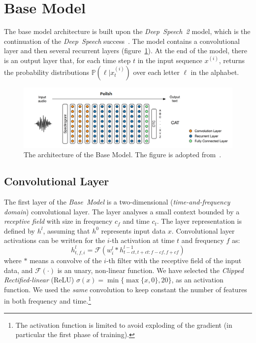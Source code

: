 \section{Base Model}\label{sec:base-model}
The base model architecture is built upon the \textit{Deep~Speech~2} model, which is
the continuation of the \textit{Deep~Speech} success~\cite{hannun2014,amodei2015}.
The model contains a convolutional layer and then several recurrent layers (figure~\ref{fig:base_model}).
At the end of the model, there is an output layer that, for each time step $t$ in the input sequence $x^{(i)}$,
returns the probability distributions $\mathbb{P}(\ell | x^{(i)}_t)$ over each letter $\ell$ in the alphabet.

\begin{figure}[!h]
    \centering
    \includegraphics[width=12cm]{figures/base_model.png}
    \caption{
The architecture of the Base Model.
The figure is adopted from~\cite{ryan2016}.
}
\label{fig:base_model}
\end{figure}

\subsection*{Convolutional Layer}

The first layer of the \textit{Base~Model} is a two-dimensional (\textit{time-and-frequency domain}) convolutional layer.
The layer analyses a small context bounded by a \textit{receptive field} with size in frequency $c_f$ and time $c_t$.
The layer representation is defined by $h^{l}$, assuming that $h^{0}$ represents input data $x$.
Convolutional layer activations can be written for the $i$-th activation at time $t$ and frequency $f$ as:
\begin{equation}
h^{l}_{t,f,i} = \mathcal{F}(w^{l}_i * h^{l-1}_{t-ct,t+ct:f-cf,f+cf})
\end{equation}
where $*$ means a convolve of the $i$-th filter with the receptive field of the input data,
and $\mathcal{F}(\cdot)$ is an unary, non-linear function.
We have selected the \textit{Clipped Rectified-linear} (ReLU) $\sigma(x) = \min\{\max\{x, 0\}, 20\}$,
as an activation function.
We used the \textit{same} convolution to keep constant the number of features in both frequency and time.\footnote{
The activation function is limited to avoid exploding of the gradient (in particular the first phase of training).
}


